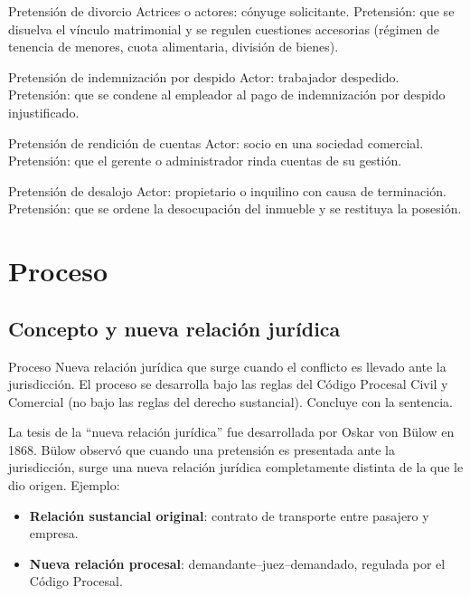 \documentclass[12pt,oneside]{book}
\begin{document}
\begin{example}{Pretensión de divorcio}
Actrices o actores: cónyuge solicitante. Pretensión: que se disuelva el vínculo matrimonial y se regulen cuestiones accesorias (régimen de tenencia de menores, cuota alimentaria, división de bienes).
\end{example}

\begin{example}{Pretensión de indemnización por despido}
Actor: trabajador despedido. Pretensión: que se condene al empleador al pago de indemnización por despido injustificado.
\end{example}

\begin{example}{Pretensión de rendición de cuentas}
Actor: socio en una sociedad comercial. Pretensión: que el gerente o administrador rinda cuentas de su gestión.
\end{example}

\begin{example}{Pretensión de desalojo}
Actor: propietario o inquilino con causa de terminación. Pretensión: que se ordene la desocupación del inmueble y se restituya la posesión.
\end{example}

\section{Proceso}

\subsection{Concepto y nueva relación jurídica}

\begin{definition}{Proceso}
Nueva relación jurídica que surge cuando el conflicto es llevado ante la jurisdicción. El proceso se desarrolla bajo las reglas del Código Procesal Civil y Comercial (no bajo las reglas del derecho sustancial). Concluye con la sentencia.
\end{definition}

La tesis de la ``nueva relación jurídica'' fue desarrollada por Oskar von Bülow en 1868. Bülow observó que cuando una pretensión es presentada ante la jurisdicción, surge una nueva relación jurídica completamente distinta de la que le dio origen. Ejemplo:

\begin{itemize}
    \item \textbf{Relación sustancial original}: contrato de transporte entre pasajero y empresa.
    \item \textbf{Nueva relación procesal}: demandante–juez–demandado, regulada por el Código Procesal.
\end{itemize}
\end{document}
